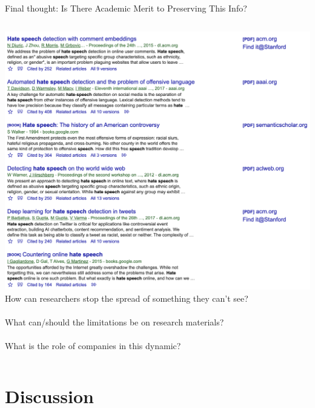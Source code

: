 \documentclass[nobackground,dvipsnames,table,aspectratio=169]{beamer}
\begin{document}
\begin{frame}{}
\begin{columns}
    \end{columns}
\end{frame}

\begin{frame}{}
    \thispagestyle{empty}
\end{frame}

\begin{frame}{Final thought: Is There Academic Merit to Preserving This Info?}
    \begin{columns}
            \includegraphics[width=\textwidth]{hate-speech-research}
            \small
            How can researchers stop the spread of something they can’t see?\\~\\
            
            What can/should the limitations be on research materials?\\~\\
            
            What is the role of companies in this dynamic?
    \end{columns}
\end{frame}

\section{Discussion}
\end{document}
